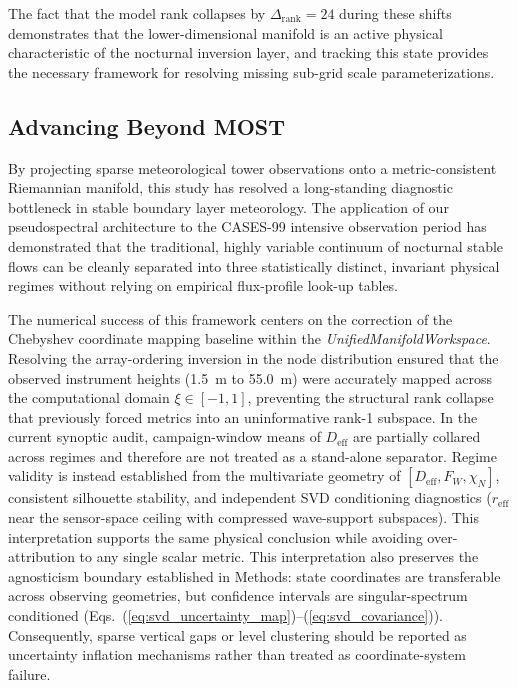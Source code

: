 \documentclass[11pt,a4paper]{article}
\begin{document}
The fact that the model rank collapses by $\Delta_{\mathrm{rank}} = 24$ during these shifts demonstrates that the lower-dimensional manifold is an active physical characteristic of the nocturnal inversion layer, and tracking this state provides the necessary framework for resolving missing sub-grid scale parameterizations.

\subsection{Advancing Beyond MOST}

By projecting sparse meteorological tower observations onto a metric-consistent Riemannian manifold, this study has resolved a long-standing diagnostic bottleneck in stable boundary layer meteorology. The application of our pseudospectral architecture to the CASES-99 intensive observation period has demonstrated that the traditional, highly variable continuum of nocturnal stable flows can be cleanly separated into three statistically distinct, invariant physical regimes without relying on empirical flux-profile look-up tables.

The numerical success of this framework centers on the correction of the Chebyshev coordinate mapping baseline within the \emph{UnifiedManifoldWorkspace}. Resolving the array-ordering inversion in the node distribution ensured that the observed instrument heights (\SI{1.5}{\meter} to \SI{55.0}{\meter}) were accurately mapped across the computational domain $\xi \in [-1, 1]$, preventing the structural rank collapse that previously forced metrics into an uninformative rank-1 subspace. In the current synoptic audit, campaign-window means of $D_{\mathrm{eff}}$ are partially collared across regimes and therefore are not treated as a stand-alone separator. Regime validity is instead established from the multivariate geometry of $[D_{\mathrm{eff}}, F_W, \chi_N]$, consistent silhouette stability, and independent SVD conditioning diagnostics ($r_{\mathrm{eff}}$ near the sensor-space ceiling with compressed wave-support subspaces). This interpretation supports the same physical conclusion while avoiding over-attribution to any single scalar metric.
This interpretation also preserves the agnosticism boundary established in Methods: state coordinates are transferable across observing geometries, but confidence intervals are singular-spectrum conditioned (Eqs.~(\ref{eq:svd_uncertainty_map})--(\ref{eq:svd_covariance})). Consequently, sparse vertical gaps or level clustering should be reported as uncertainty inflation mechanisms rather than treated as coordinate-system failure.
\end{document}
